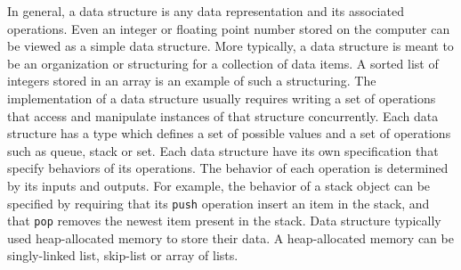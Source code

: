 In general, a data structure is any data representation and its
associated operations. Even an integer or floating point number stored on the computer can be viewed as a simple data structure. More typically, a data structure is meant to be an organization or structuring for a collection of data items. A sorted list of integers stored in an array is an example of such a structuring. The implementation of a data structure usually requires writing a set of operations that access and manipulate instances of that structure concurrently. Each data structure has a type which defines a set of possible values and a set of operations such as queue, stack or set. Each data structure have its own specification that specify behaviors of its operations. The behavior of each operation is determined by its inputs and outputs. For example, the behavior of a stack object can be specified by requiring that its {\tt push} operation insert an item in the stack, and that {\tt pop} removes the newest item present in the stack. Data structure typically used heap-allocated memory to store their data. A heap-allocated memory can be singly-linked list, skip-list or array of lists. 


